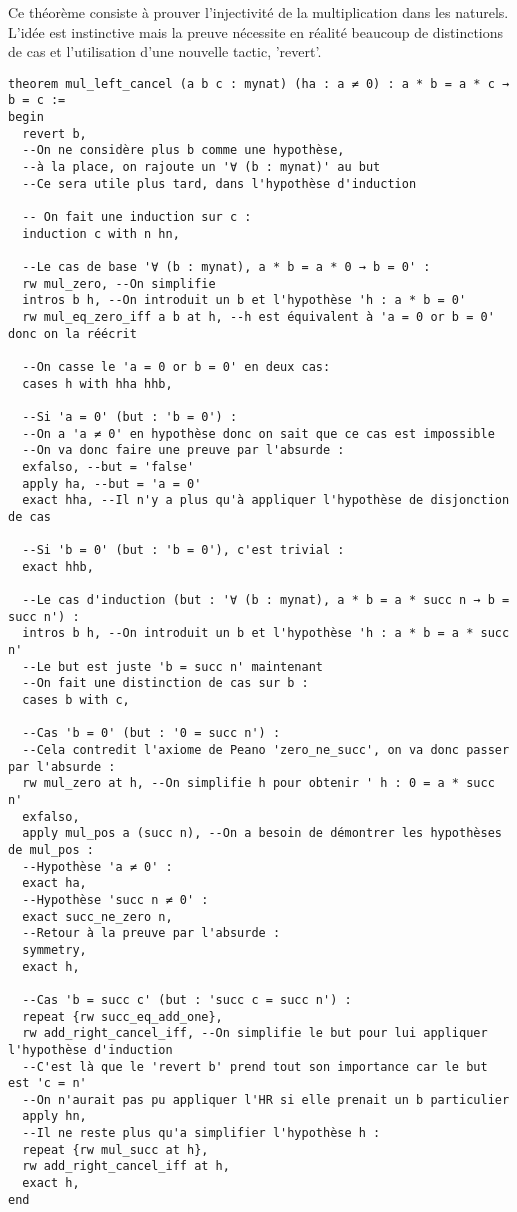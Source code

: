Ce théorème consiste à prouver l'injectivité de la multiplication dans les naturels.
L'idée est instinctive mais la preuve nécessite en réalité beaucoup de distinctions de cas et l'utilisation d'une nouvelle tactic, 'revert'.
\begin{verbatim}
theorem mul_left_cancel (a b c : mynat) (ha : a ≠ 0) : a * b = a * c → b = c :=
begin
  revert b,
  --On ne considère plus b comme une hypothèse,
  --à la place, on rajoute un '∀ (b : mynat)' au but
  --Ce sera utile plus tard, dans l'hypothèse d'induction
  
  -- On fait une induction sur c :
  induction c with n hn,

  --Le cas de base '∀ (b : mynat), a * b = a * 0 → b = 0' :
  rw mul_zero, --On simplifie
  intros b h, --On introduit un b et l'hypothèse 'h : a * b = 0'
  rw mul_eq_zero_iff a b at h, --h est équivalent à 'a = 0 or b = 0' donc on la réécrit
  
  --On casse le 'a = 0 or b = 0' en deux cas:
  cases h with hha hhb,
  
  --Si 'a = 0' (but : 'b = 0') :
  --On a 'a ≠ 0' en hypothèse donc on sait que ce cas est impossible
  --On va donc faire une preuve par l'absurde :
  exfalso, --but = 'false'
  apply ha, --but = 'a = 0'
  exact hha, --Il n'y a plus qu'à appliquer l'hypothèse de disjonction de cas
  
  --Si 'b = 0' (but : 'b = 0'), c'est trivial :
  exact hhb,

  --Le cas d'induction (but : '∀ (b : mynat), a * b = a * succ n → b = succ n') :
  intros b h, --On introduit un b et l'hypothèse 'h : a * b = a * succ n'
  --Le but est juste 'b = succ n' maintenant
  --On fait une distinction de cas sur b :
  cases b with c,

  --Cas 'b = 0' (but : '0 = succ n') :
  --Cela contredit l'axiome de Peano 'zero_ne_succ', on va donc passer par l'absurde :
  rw mul_zero at h, --On simplifie h pour obtenir ' h : 0 = a * succ n'
  exfalso,
  apply mul_pos a (succ n), --On a besoin de démontrer les hypothèses de mul_pos :
  --Hypothèse 'a ≠ 0' :
  exact ha,
  --Hypothèse 'succ n ≠ 0' :
  exact succ_ne_zero n,
  --Retour à la preuve par l'absurde :
  symmetry,
  exact h,

  --Cas 'b = succ c' (but : 'succ c = succ n') :
  repeat {rw succ_eq_add_one},
  rw add_right_cancel_iff, --On simplifie le but pour lui appliquer l'hypothèse d'induction
  --C'est là que le 'revert b' prend tout son importance car le but est 'c = n'
  --On n'aurait pas pu appliquer l'HR si elle prenait un b particulier
  apply hn,
  --Il ne reste plus qu'a simplifier l'hypothèse h :
  repeat {rw mul_succ at h},
  rw add_right_cancel_iff at h,
  exact h,
end
\end{verbatim}


